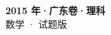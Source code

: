\documentclass[zihao=-4, a4paper]{ctexart}
\begin{document}
\begin{center}
  {\Large\bfseries 2015 年·广东卷·理科}\\[4pt]
  {\large 数学 · 试题版}
\end{center}
\medskip
{}

\end{document}
